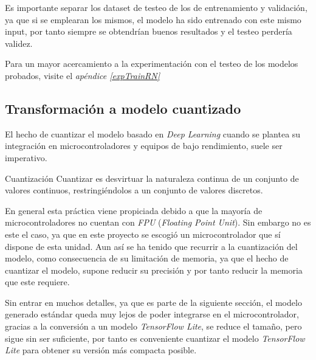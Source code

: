 Es importante separar los dataset de testeo de los de entrenamiento
y validación, ya que si se emplearan los mismos, el modelo ha sido entrenado
con este mismo input, por tanto siempre se obtendrían buenos resultados
y el testeo perdería validez.

Para un mayor acercamiento a la experimentación con el testeo de los modelos
probados, visite el \textit{apéndice \ref{expTrainRN}}

\subsection{Transformación a modelo cuantizado}
El hecho de cuantizar el modelo basado en \textit{Deep Learning} cuando se
plantea su integración en microcontroladores y equipos de bajo rendimiento,
suele ser imperativo.

\begin{teoria}{Cuantización}
    \color{mitexto}
    Cuantizar es desvirtuar la naturaleza continua de un conjunto de valores continuos,
    restringiéndolos a un conjunto de valores discretos.
\end{teoria}

En general esta práctica viene propiciada debido a que
la mayoría de microcontroladores no cuentan con \textit{FPU}
(\textit{Floating Point Unit}). Sin embargo no es este el caso, ya que en este
proyecto se escogió un microcontrolador que sí dispone de esta unidad. Aun
así se ha tenido que recurrir a la cuantización del modelo, como consecuencia
de su limitación de memoria, ya que el hecho de cuantizar el modelo, supone
reducir su precisión y por tanto reducir la memoria que este requiere.

Sin entrar en muchos detalles, ya que es parte de la siguiente sección,
el modelo generado estándar queda muy lejos de poder integrarse en el
microcontrolador, gracias a la conversión a un modelo \textit{TensorFlow Lite},
se reduce el tamaño, pero sigue sin ser suficiente, por tanto es conveniente
cuantizar el modelo \textit{TensorFlow Lite} para obtener su
versión más compacta posible.


